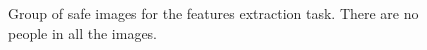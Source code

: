 \begin{figure}
    \hspace{\subfigurehspacing}
    \hspace{\subfigurehspacing}
    \vspace{0.1cm}
    \caption[Group of safe images for the features extraction task]
    {Group of safe images for the features extraction task. There are no 
    people in all the images.}
    \label{fig:safe_group}
\end{figure}
